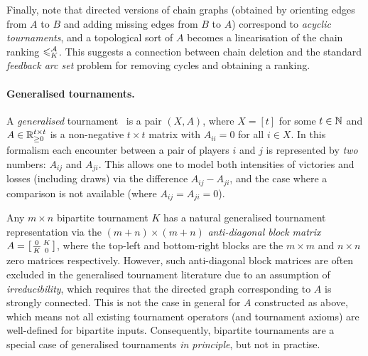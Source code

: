 Finally, note that directed versions of chain graphs (obtained by orienting
edges from $A$ to $B$ and adding missing edges from $B$ to $A$) correspond to
\emph{acyclic tournaments}, and a topological sort of $A$ becomes a
linearisation of the chain ranking $\leqslant^{\mathcal{A}}_K$. This suggests a connection
between chain deletion and the standard \emph{feedback arc set} problem for
removing cycles and obtaining a ranking.

\paragraph{Generalised tournaments.}
%
A \emph{generalised} tournament~\cite{gonzalez2014paired} is a pair $(X, A)$,
where $X = [t]$ for some $t \in \mathbb{N}$ and $A \in \mathbb{R}_{\ge 0}^{t \times t}$ is a
non-negative $t \times t$ matrix with $A_{ii} = 0$ for all $i \in X$. In this
formalism each encounter between a pair of players $i$ and $j$ is represented
by \emph{two} numbers: $A_{ij}$ and $A_{ji}$. This allows one to model both
intensities of victories and losses (including draws) via the difference
$A_{ij} - A_{ji}$, and the case where a comparison is not available (where
$A_{ij} = A_{ji} = 0$).

Any $m \times n$ bipartite tournament $K$ has a natural generalised tournament
representation via the $(m + n) \times (m + n)$ \emph{anti-diagonal block
matrix}
$
    A = \left[\begin{smallmatrix}
        0 & K \\
        {\overline{K}} & 0
    \end{smallmatrix}\right]
$, where the top-left and bottom-right blocks are the $m \times m$ and $n
\times n$ zero matrices respectively.  However, such anti-diagonal block
matrices are often excluded in the generalised tournament literature due to an
assumption of \emph{irreducibility}, which requires that the directed graph
corresponding to $A$ is strongly connected. This is not the case in general for
$A$ constructed as above, which means not all existing tournament
operators (and tournament axioms) are well-defined for bipartite
inputs.\footnotemark{} Consequently, bipartite tournaments are a special case
of generalised tournaments \emph{in principle}, but not in practise.


